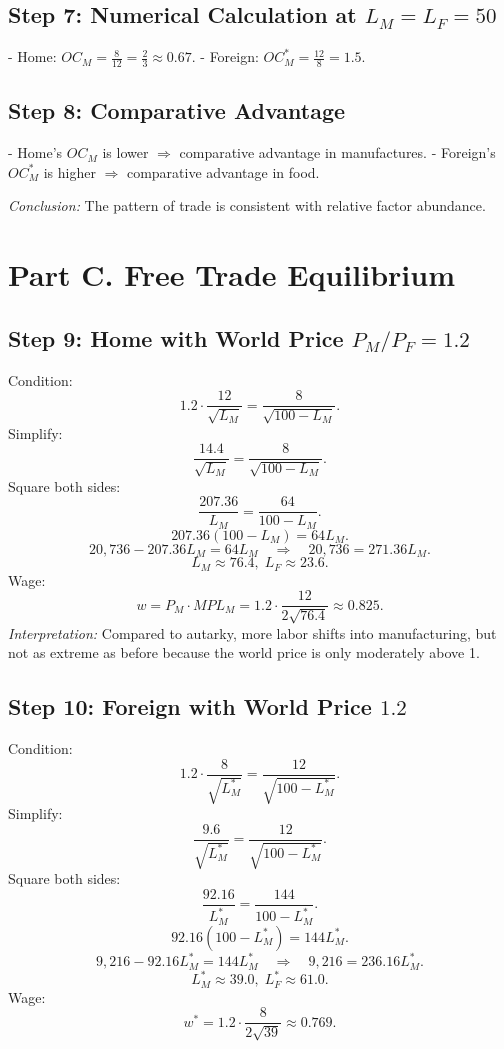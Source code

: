 \documentclass[12pt]{article}
\begin{document}
\subsection*{Step 7: Numerical Calculation at $L_M=L_F=50$}
- Home: $OC_M = \tfrac{8}{12} = \tfrac{2}{3} \approx 0.67$.  
- Foreign: $OC_M^{*} = \tfrac{12}{8} = 1.5$.  

\subsection*{Step 8: Comparative Advantage}
- Home’s $OC_M$ is lower $\Rightarrow$ comparative advantage in manufactures.  
- Foreign’s $OC_M^{*}$ is higher $\Rightarrow$ comparative advantage in food.  

\textit{Conclusion:} The pattern of trade is consistent with relative factor abundance.

\bigskip

\section*{Part C. Free Trade Equilibrium}

\subsection*{Step 9: Home with World Price $P_M/P_F=1.2$}
Condition:
\[
1.2 \cdot \frac{12}{\sqrt{L_M}} = \frac{8}{\sqrt{100-L_M}}.
\]
Simplify:
\[
\frac{14.4}{\sqrt{L_M}} = \frac{8}{\sqrt{100-L_M}}.
\]
Square both sides:
\[
\frac{207.36}{L_M} = \frac{64}{100-L_M}.
\]
\[
207.36(100-L_M) = 64 L_M.
\]
\[
20,736 - 207.36 L_M = 64 L_M \quad \Rightarrow \quad 20,736 = 271.36 L_M.
\]
\[
L_M \approx 76.4, \; L_F \approx 23.6.
\]
Wage:
\[
w = P_M \cdot MPL_M = 1.2 \cdot \frac{12}{2\sqrt{76.4}} \approx 0.825.
\]
\textit{Interpretation:} Compared to autarky, more labor shifts into manufacturing, but not as extreme as before because the world price is only moderately above 1.

\subsection*{Step 10: Foreign with World Price $1.2$}
Condition:
\[
1.2 \cdot \frac{8}{\sqrt{L_M^{*}}} = \frac{12}{\sqrt{100-L_M^{*}}}.
\]
Simplify:
\[
\frac{9.6}{\sqrt{L_M^{*}}} = \frac{12}{\sqrt{100-L_M^{*}}}.
\]
Square both sides:
\[
\frac{92.16}{L_M^{*}} = \frac{144}{100-L_M^{*}}.
\]
\[
92.16(100-L_M^{*}) = 144 L_M^{*}.
\]
\[
9,216 - 92.16 L_M^{*} = 144 L_M^{*} \quad \Rightarrow \quad 9,216 = 236.16 L_M^{*}.
\]
\[
L_M^{*} \approx 39.0,\; L_F^{*} \approx 61.0.
\]
Wage:
\[
w^{*} = 1.2 \cdot \frac{8}{2\sqrt{39}} \approx 0.769.
\]
\end{document}
